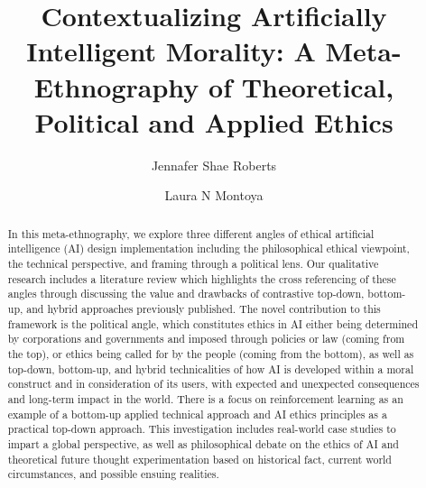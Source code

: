 \documentclass{svproc}
\begin{document}
\mainmatter              %
%
\title{Contextualizing Artificially Intelligent Morality: 
A Meta-Ethnography of Theoretical, Political and Applied Ethics}
%
%
\author{Jennafer Shae Roberts \and Laura N Montoya
}
%
%
%

\maketitle              %

\begin{abstract}
In this meta-ethnography, we explore three different angles of ethical artificial intelligence (AI) design implementation including the philosophical ethical viewpoint, the technical perspective, and framing through a political lens. Our qualitative research includes a literature review which highlights the cross referencing of these angles through discussing the value and drawbacks of contrastive top-down, bottom-up, and hybrid approaches previously published. The novel contribution to this framework is the political angle, which constitutes ethics in AI either being determined by corporations and governments and imposed through policies or law (coming from the top), or ethics being called for by the people (coming from the bottom), as well as top-down, bottom-up, and hybrid technicalities of how AI is developed within a moral construct and in consideration of its users, with expected and unexpected consequences and long-term impact in the world. There is a focus on reinforcement learning as an example of a bottom-up applied technical approach and AI ethics principles as a practical top-down approach. This investigation includes real-world case studies to impart a global perspective, as well as philosophical debate on the ethics of AI and theoretical future thought experimentation based on historical fact, current world circumstances, and possible ensuing realities. 

\end{abstract}
%
\end{document}
